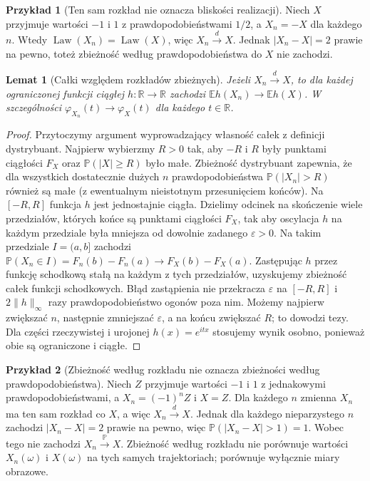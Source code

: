 \documentclass[11pt,a4paper,oneside]{report}
\numberwithin{equation}{chapter}
\theoremstyle{plain}
\newtheorem{lemat}[twierdzenie]{Lemat}
\theoremstyle{definition}
\newtheorem{przyklad}{Przykład}[chapter]
\theoremstyle{remark}
\newcommand{\R}{\mathbb{R}}
\newcommand{\Prob}{\mathbb{P}}
\newcommand{\E}{\mathbb{E}}
\newcommand{\Law}{\operatorname{Law}}
\begin{document}
\begin{przyklad}[Ten sam rozkład nie oznacza bliskości realizacji]
Niech $X$ przyjmuje wartości $-1$ i $1$ z
prawdopodobieństwami $1/2$, a $X_n=-X$ dla każdego $n$.
Wtedy $\Law(X_n)=\Law(X)$, więc $X_n\xrightarrow{d}X$.
Jednak $|X_n-X|=2$ prawie na pewno, toteż zbieżność
według prawdopodobieństwa do $X$ nie zachodzi.
\end{przyklad}

\begin{lemat}[Całki względem rozkładów zbieżnych]
Jeżeli $X_n\xrightarrow{d}X$, to dla każdej ograniczonej
funkcji ciągłej $h:\R\to\R$ zachodzi
$\E h(X_n)\to\E h(X)$.
W szczególności $\varphi_{X_n}(t)\to\varphi_X(t)$
dla każdego $t\in\R$.
\end{lemat}
\begin{proof}
Przytoczymy argument wyprowadzający własność całek
z definicji dystrybuant. Najpierw wybierzmy $R>0$ tak,
aby $-R$ i $R$ były punktami ciągłości $F_X$ oraz
$\Prob(|X|\geq R)$ było małe. Zbieżność dystrybuant
zapewnia, że dla wszystkich dostatecznie dużych $n$
prawdopodobieństwa $\Prob(|X_n|>R)$ również są małe
(z ewentualnym nieistotnym przesunięciem końców).
Na $[-R,R]$ funkcja $h$ jest jednostajnie ciągła.
Dzielimy odcinek na skończenie wiele przedziałów,
których końce są punktami ciągłości $F_X$, tak aby
oscylacja $h$ na każdym przedziale była mniejsza
od dowolnie zadanego $\varepsilon>0$.
Na takim przedziale $I=(a,b]$ zachodzi
$\Prob(X_n\in I)=F_n(b)-F_n(a)\to F_X(b)-F_X(a)$.
Zastępując $h$ przez funkcję schodkową stałą na
każdym z tych przedziałów, uzyskujemy zbieżność
całek funkcji schodkowych. Błąd zastąpienia nie
przekracza $\varepsilon$ na $[-R,R]$ i
$2\|h\|_\infty$ razy prawdopodobieństwo ogonów
poza nim. Możemy najpierw zwiększać $n$, następnie
zmniejszać $\varepsilon$, a na końcu zwiększać $R$;
to dowodzi tezy. Dla części rzeczywistej i urojonej
$h(x)=e^{itx}$ stosujemy wynik osobno, ponieważ
obie są ograniczone i ciągłe.
\end{proof}


\begin{przyklad}[Zbieżność według rozkładu nie oznacza zbieżności według prawdopodobieństwa]
Niech $Z$ przyjmuje wartości $-1$ i $1$ z jednakowymi
prawdopodobieństwami, a $X_n=(-1)^nZ$ i $X=Z$.
Dla każdego $n$ zmienna $X_n$ ma ten sam rozkład co $X$,
a więc $X_n\xrightarrow{d}X$. Jednak dla każdego
nieparzystego $n$ zachodzi $|X_n-X|=2$ prawie na pewno,
więc $\Prob(|X_n-X|>1)=1$.
Wobec tego nie zachodzi $X_n\xrightarrow{\Prob}X$.
Zbieżność według rozkładu nie porównuje wartości
$X_n(\omega)$ i $X(\omega)$ na tych samych trajektoriach;
porównuje wyłącznie miary obrazowe.
\end{przyklad}
\end{document}
